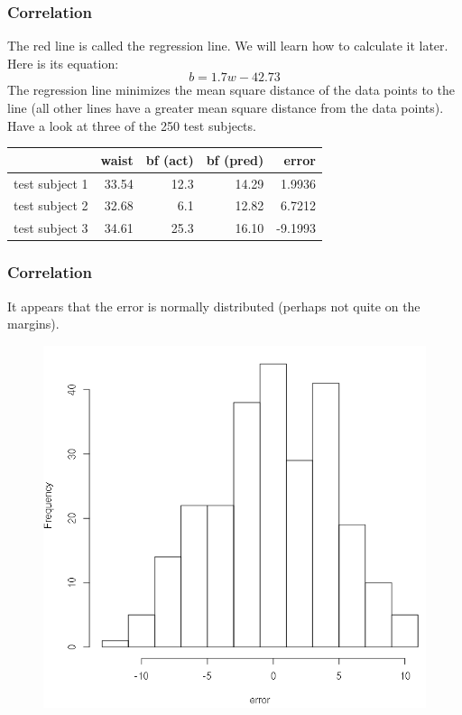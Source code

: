 \documentclass[xcolor=dvipsnames]{beamer}
\begin{document}
\begin{frame}
  \frametitle{Correlation}
  The red line is called the regression line. We will learn how to
  calculate it later. Here is its equation:
\begin{equation}
  \label{eq:chuitohf}
  b=1.7w-42.73
\end{equation}
The regression line minimizes the mean square distance of the data
points to the line (all other lines have a greater mean square
distance from the data points). Have a look at three of the 250 test
subjects.

\begin{tabular}{|l|r|r|r|r|}\hline
                 & waist & bf (act) & bf (pred) & error   \\ \hline
  test subject 1 & 33.54 & 12.3     & 14.29     & 1.9936  \\ \hline
  test subject 2 & 32.68 & 6.1      & 12.82     & 6.7212  \\ \hline
  test subject 3 & 34.61 & 25.3     & 16.10     & -9.1993 \\ \hline
\end{tabular}
\end{frame}

\begin{frame}
  \frametitle{Correlation}
  It appears that the error is normally distributed (perhaps not quite
  on the margins).
\begin{figure}[h]
\includegraphics[scale=.3]{./diagrams/bf-04.png}
\end{figure}
\end{frame}
\end{document}
